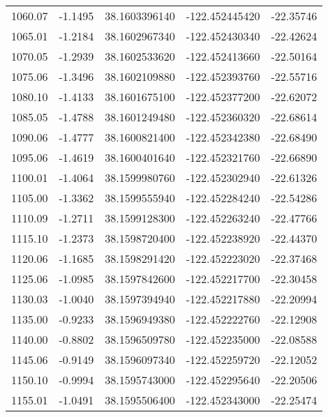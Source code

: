 \begin{longtable}{p{2.5cm}p{2.5cm}p{3cm}p{3cm}p{2.5cm}}
      1060.07  & 	-1.1495 &               38.1603396140  &   -122.452445420   &	-22.35746 \\
      1065.01  & 	-1.2184 &               38.1602967340  &   -122.452430340   &	-22.42624 \\
      1070.05  & 	-1.2939 &               38.1602533620  &   -122.452413660   &	-22.50164 \\
      1075.06  & 	-1.3496 &               38.1602109880  &   -122.452393760   &	-22.55716 \\
      1080.10  & 	-1.4133 &               38.1601675100  &   -122.452377200   &	-22.62072 \\
      1085.05  & 	-1.4788 &               38.1601249480  &   -122.452360320   &	-22.68614 \\
      1090.06  & 	-1.4777 &               38.1600821400  &   -122.452342380   &	-22.68490 \\
      1095.06  & 	-1.4619 &               38.1600401640  &   -122.452321760   &	-22.66890 \\
      1100.01  & 	-1.4064 &               38.1599980760  &   -122.452302940   &	-22.61326 \\
      1105.00  & 	-1.3362 &               38.1599555940  &   -122.452284240   &	-22.54286 \\
      1110.09  & 	-1.2711 &               38.1599128300  &   -122.452263240   &	-22.47766 \\
      1115.10  & 	-1.2373 &               38.1598720400  &   -122.452238920   &	-22.44370 \\
      1120.06  & 	-1.1685 &               38.1598291420  &   -122.452223020   &	-22.37468 \\
      1125.06  & 	-1.0985 &               38.1597842600  &   -122.452217700   &	-22.30458 \\
      1130.03  & 	-1.0040 &               38.1597394940  &   -122.452217880   &	-22.20994 \\
      1135.00  & 	-0.9233 &               38.1596949380  &   -122.452222760   &	-22.12908 \\
      1140.00  & 	-0.8802 &               38.1596509780  &   -122.452235000   &	-22.08588 \\
      1145.06  & 	-0.9149 &               38.1596097340  &   -122.452259720   &	-22.12052 \\
      1150.10  & 	-0.9994 &               38.1595743000  &   -122.452295640   &	-22.20506 \\
      1155.01  & 	-1.0491 &               38.1595506400  &   -122.452343000   &	-22.25474 \\

\end{longtable}
